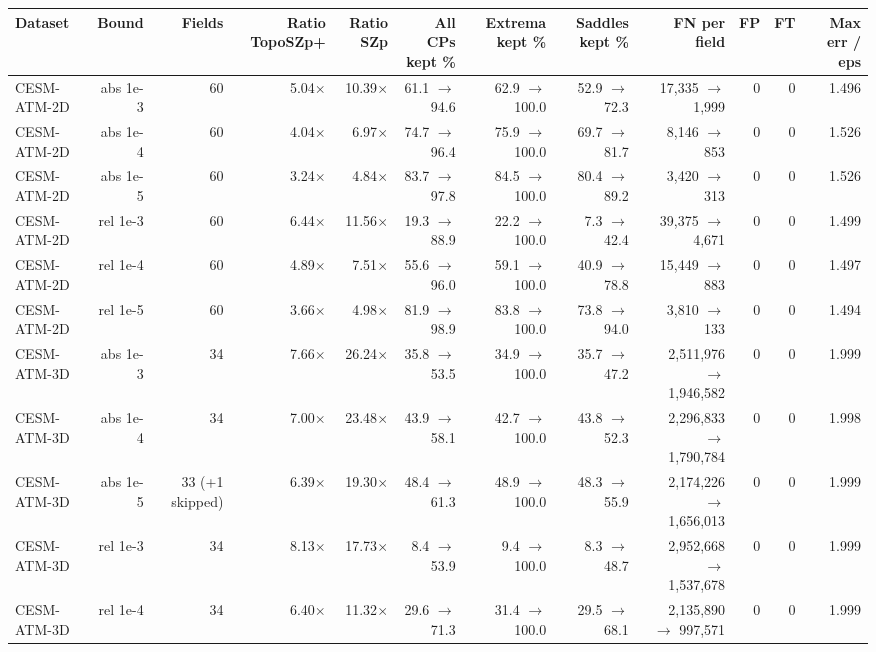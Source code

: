 \begin{tabular}{lrrrrrrrrrrr}
\toprule
\textbf{Dataset} & \textbf{Bound} & \textbf{Fields} & \textbf{Ratio TopoSZp+} & \textbf{Ratio SZp} & \textbf{All CPs kept \%} & \textbf{Extrema kept \%} & \textbf{Saddles kept \%} & \textbf{FN per field} & \textbf{FP} & \textbf{FT} & \textbf{Max err / eps} \\
\midrule
CESM-ATM-2D & abs 1e-3 & 60 & 5.04$\times$ & 10.39$\times$ & 61.1 $\to$ 94.6 & 62.9 $\to$ 100.0 & 52.9 $\to$ 72.3 & 17,335 $\to$ 1,999 & 0 & 0 & 1.496 \\
CESM-ATM-2D & abs 1e-4 & 60 & 4.04$\times$ & 6.97$\times$ & 74.7 $\to$ 96.4 & 75.9 $\to$ 100.0 & 69.7 $\to$ 81.7 & 8,146 $\to$ 853 & 0 & 0 & 1.526 \\
CESM-ATM-2D & abs 1e-5 & 60 & 3.24$\times$ & 4.84$\times$ & 83.7 $\to$ 97.8 & 84.5 $\to$ 100.0 & 80.4 $\to$ 89.2 & 3,420 $\to$ 313 & 0 & 0 & 1.526 \\
CESM-ATM-2D & rel 1e-3 & 60 & 6.44$\times$ & 11.56$\times$ & 19.3 $\to$ 88.9 & 22.2 $\to$ 100.0 & 7.3 $\to$ 42.4 & 39,375 $\to$ 4,671 & 0 & 0 & 1.499 \\
CESM-ATM-2D & rel 1e-4 & 60 & 4.89$\times$ & 7.51$\times$ & 55.6 $\to$ 96.0 & 59.1 $\to$ 100.0 & 40.9 $\to$ 78.8 & 15,449 $\to$ 883 & 0 & 0 & 1.497 \\
CESM-ATM-2D & rel 1e-5 & 60 & 3.66$\times$ & 4.98$\times$ & 81.9 $\to$ 98.9 & 83.8 $\to$ 100.0 & 73.8 $\to$ 94.0 & 3,810 $\to$ 133 & 0 & 0 & 1.494 \\
CESM-ATM-3D & abs 1e-3 & 34 & 7.66$\times$ & 26.24$\times$ & 35.8 $\to$ 53.5 & 34.9 $\to$ 100.0 & 35.7 $\to$ 47.2 & 2,511,976 $\to$ 1,946,582 & 0 & 0 & 1.999 \\
CESM-ATM-3D & abs 1e-4 & 34 & 7.00$\times$ & 23.48$\times$ & 43.9 $\to$ 58.1 & 42.7 $\to$ 100.0 & 43.8 $\to$ 52.3 & 2,296,833 $\to$ 1,790,784 & 0 & 0 & 1.998 \\
CESM-ATM-3D & abs 1e-5 & 33 (+1 skipped) & 6.39$\times$ & 19.30$\times$ & 48.4 $\to$ 61.3 & 48.9 $\to$ 100.0 & 48.3 $\to$ 55.9 & 2,174,226 $\to$ 1,656,013 & 0 & 0 & 1.999 \\
CESM-ATM-3D & rel 1e-3 & 34 & 8.13$\times$ & 17.73$\times$ & 8.4 $\to$ 53.9 & 9.4 $\to$ 100.0 & 8.3 $\to$ 48.7 & 2,952,668 $\to$ 1,537,678 & 0 & 0 & 1.999 \\
CESM-ATM-3D & rel 1e-4 & 34 & 6.40$\times$ & 11.32$\times$ & 29.6 $\to$ 71.3 & 31.4 $\to$ 100.0 & 29.5 $\to$ 68.1 & 2,135,890 $\to$ 997,571 & 0 & 0 & 1.999 \\

\end{tabular}
